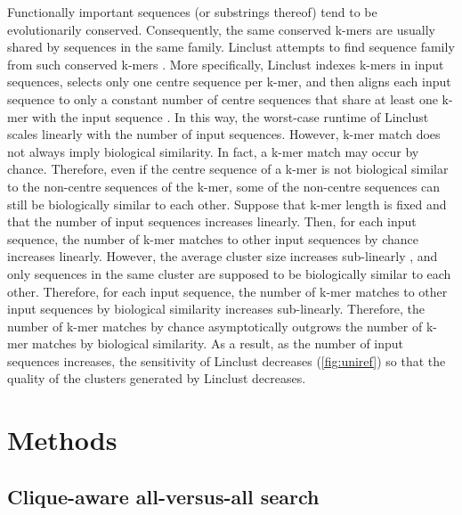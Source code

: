 \documentclass{bioinfo}
\begin{document}
Functionally important sequences (or substrings thereof) tend to be evolutionarily conserved.
Consequently, the same conserved k-mers are usually shared by sequences in the same family.
Linclust attempts to find sequence family from such conserved k-mers \citep{steinegger2017linclust}.
More specifically, 
Linclust indexes k-mers in input sequences, 
selects only one centre sequence per k-mer,
and then aligns each input sequence to only a constant number of centre sequences that share at least one k-mer with the input sequence \citep{steinegger2017linclust}.
In this way, the worst-case runtime of Linclust scales linearly with the number of input sequences.
However, k-mer match does not always imply biological similarity.
In fact, a k-mer match may occur by chance.
Therefore,
even if the centre sequence of a k-mer is not biological similar to the non-centre sequences of the k-mer, 
some of the non-centre sequences can still be biologically similar to each other.
Suppose that k-mer length is fixed and that the number of input sequences increases linearly.
Then, for each input sequence,
the number of k-mer matches to other input sequences by chance increases linearly.
However,
the average cluster size increases sub-linearly \citep[Fig. 3]{suzek2014uniref},
and only sequences in the same cluster are supposed to be biologically similar to each other.
Therefore,
for each input sequence,
the number of k-mer matches to other input sequences by biological similarity increases sub-linearly.
Therefore, the number of k-mer matches by chance asymptotically outgrows the number of k-mer matches by biological similarity.
As a result, as the number of input sequences increases, 
the sensitivity of Linclust decreases (\cref{fig:uniref}) so that the quality of the clusters generated by Linclust decreases.

\section{Methods}
\label{sec:methods}


\subsection{Clique-aware all-versus-all search}
\label{subsec:clique-aware}
\end{document}
